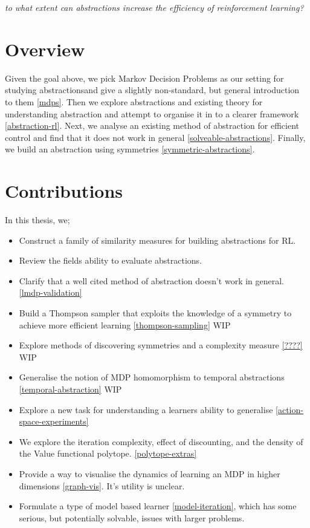 \begin{displayquote}
\textit{to what extent can abstractions increase the efficiency of reinforcement learning?}
\end{displayquote}

\section{Overview}

Given the goal above, we pick Markov Decision Problems as our setting for studying abstractions\footnotemark[43] and give a slightly non-standard, but general introduction to them \ref{mdps}.
Then we explore abstractions and existing theory for understanding abstraction and attempt to organise it in to a clearer framework \ref{abstraction-rl}.
Next, we analyse an existing method of abstraction for efficient control and find that it does not work in general \ref{solveable-abstractions}.
Finally, we build an abstraction using symmetries \ref{symmetric-abstractions}.


\section{Contributions}

In this thesis, we;

\begin{itemize}
  \tightlist
  \item Construct a family of similarity measures for building abstractions for RL.
  \item Review the fields ability to evaluate abstractions.
  \item Clarify that a well cited method of abstraction doesn't work in general. \ref{lmdp-validation}
  \item Build a Thompson sampler that exploits the knowledge of a symmetry to achieve more efficient learning \ref{thompson-sampling} {\color{red}WIP}
  \item Explore methods of discovering symmetries and a complexity measure \ref{????} {\color{red}WIP}
  \item Generalise the notion of MDP homomorphism to temporal abstractions \ref{temporal-abstraction} {\color{red}WIP}
  \item Explore a new task for understanding a learners ability to generalise \ref{action-space-experiments}
  \item We explore the iteration complexity, effect of discounting, and the density of the Value functional polytope. \ref{polytope-extras}
  \item Provide a way to visualise the dynamics of learning an MDP in higher dimensions \ref{graph-vis}. It's utility is unclear.
  \item Formulate a type of model based learner \ref{model-iteration}, which has some serious, but potentially solvable, issues with larger problems.
\end{itemize}
